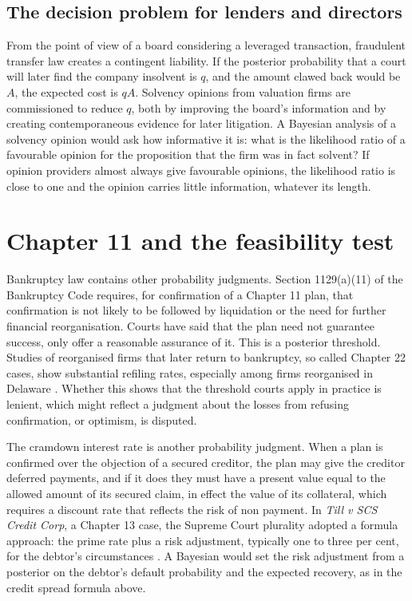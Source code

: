 \subsection{The decision problem for lenders and directors}

From the point of view of a board considering a leveraged transaction, fraudulent transfer law creates a contingent liability. If the posterior probability that a court will later find the company insolvent is $q$, and the amount clawed back would be $A$, the expected cost is $qA$. Solvency opinions from valuation firms are commissioned to reduce $q$, both by improving the board's information and by creating contemporaneous evidence for later litigation. A Bayesian analysis of a solvency opinion would ask how informative it is: what is the likelihood ratio of a favourable opinion for the proposition that the firm was in fact solvent? If opinion providers almost always give favourable opinions, the likelihood ratio is close to one and the opinion carries little information, whatever its length.

\section{Chapter 11 and the feasibility test}

Bankruptcy law contains other probability judgments. Section 1129(a)(11) of the Bankruptcy Code requires, for confirmation of a Chapter 11 plan, that confirmation is not likely to be followed by liquidation or the need for further financial reorganisation. Courts have said that the plan need not guarantee success, only offer a reasonable assurance of it. This is a posterior threshold. Studies of reorganised firms that later return to bankruptcy, so called Chapter 22 cases, show substantial refiling rates, especially among firms reorganised in Delaware \citep{lopucki2002}. Whether this shows that the threshold courts apply in practice is lenient, which might reflect a judgment about the losses from refusing confirmation, or optimism, is disputed.

The cramdown interest rate is another probability judgment. When a plan is confirmed over the objection of a secured creditor, the plan may give the creditor deferred payments, and if it does they must have a present value equal to the allowed amount of its secured claim, in effect the value of its collateral, which requires a discount rate that reflects the risk of non payment. In \emph{Till v SCS Credit Corp}, a Chapter 13 case, the Supreme Court plurality adopted a formula approach: the prime rate plus a risk adjustment, typically one to three per cent, for the debtor's circumstances \citep{till2004}. A Bayesian would set the risk adjustment from a posterior on the debtor's default probability and the expected recovery, as in the credit spread formula above.

